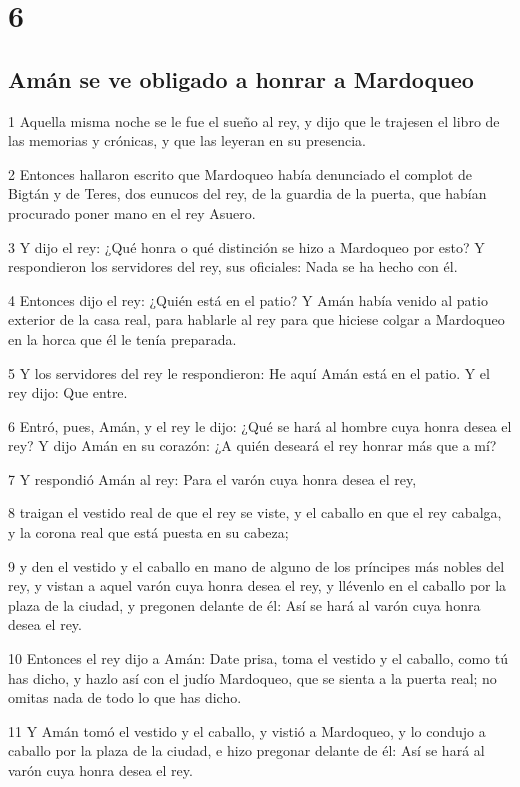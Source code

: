 \chapter{6}

\section*{Amán se ve obligado a honrar a Mardoqueo}

\par 1 Aquella misma noche se le fue el sueño al rey, y dijo que le trajesen el libro de las memorias y crónicas, y que las leyeran en su presencia.
\par 2 Entonces hallaron escrito que Mardoqueo había denunciado el complot de Bigtán y de Teres, dos eunucos del rey, de la guardia de la puerta, que habían procurado poner mano en el rey Asuero. 
\par 3 Y dijo el rey: ¿Qué honra o qué distinción se hizo a Mardoqueo por esto? Y respondieron los servidores del rey, sus oficiales: Nada se ha hecho con él.
\par 4 Entonces dijo el rey: ¿Quién está en el patio? Y Amán había venido al patio exterior de la casa real, para hablarle al rey para que hiciese colgar a Mardoqueo en la horca que él le tenía preparada.
\par 5 Y los servidores del rey le respondieron: He aquí Amán está en el patio. Y el rey dijo: Que entre.
\par 6 Entró, pues, Amán, y el rey le dijo: ¿Qué se hará al hombre cuya honra desea el rey? Y dijo Amán en su corazón: ¿A quién deseará el rey honrar más que a mí?
\par 7 Y respondió Amán al rey: Para el varón cuya honra desea el rey,
\par 8 traigan el vestido real de que el rey se viste, y el caballo en que el rey cabalga, y la corona real que está puesta en su cabeza;
\par 9 y den el vestido y el caballo en mano de alguno de los príncipes más nobles del rey, y vistan a aquel varón cuya honra desea el rey, y llévenlo en el caballo por la plaza de la ciudad, y pregonen delante de él: Así se hará al varón cuya honra desea el rey.
\par 10 Entonces el rey dijo a Amán: Date prisa, toma el vestido y el caballo, como tú has dicho, y hazlo así con el judío Mardoqueo, que se sienta a la puerta real; no omitas nada de todo lo que has dicho.
\par 11 Y Amán tomó el vestido y el caballo, y vistió a Mardoqueo, y lo condujo a caballo por la plaza de la ciudad, e hizo pregonar delante de él: Así se hará al varón cuya honra desea el rey.
